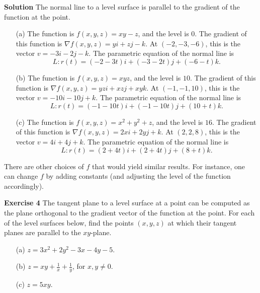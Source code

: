 \documentclass[12pt,oneside]{exam}
\newenvironment{exercise}[1]{\vspace{.1in}\noindent\textbf{Exercise #1 \hspace{.05em}}}{}
\newenvironment{newsolution}{\vspace{.1in}\noindent\textbf{Solution \hspace{.05em}}}{}
\begin{document}
\begin{newsolution}
The normal line to a level surface is parallel to the gradient of the function at the point. 
\begin{itemize}
\item[(a)] The function is $f(x,y,z)=xy-z$, and the level is $0$. The gradient of this function is $\nabla f(x,y,z) = yi + zj -k$. At $(-2,-3,-6)$, this is the vector 
$v=-3i -2j-k$. The parametric equation of the normal line is 
\begin{equation*}
L \colon r(t)=(-2 -3t)i +(-3-2t)j +(-6-t)k.
\end{equation*}
\item[(b)] The function is $f(x,y,z)=xyz$, and the level is $10$. The gradient of this function is $\nabla f (x,y,z)= yz i + xzj + xyk$. At $(-1,-1,10)$, this is the vector $v=-10i -10j +k$. The parametric equation of the normal line is 
\begin{equation*}
L \colon r(t)=(-1-10t)i+(-1-10t)j+(10+t)k.
\end{equation*}
\item[(c)] The function is $f(x,y,z)=x^2+y^2+z$, and the level is $16$. The gradient of this function is $\nabla f (x,y,z) = 2x i + 2y j + k$. At $(2,2,8)$, this is the vector $v=4i+4j+k$. The parametric equation of the normal line is 
\begin{equation*}
L \colon r(t)=(2+4t)i + (2+4t)j+(8+t)k.
\end{equation*}
\end{itemize}
There are other choices of $f$ that would yield similar results. For instance, one can change $f$ by adding constants (and adjusting the level of the function accordingly).
\end{newsolution}

\begin{exercise}{4}
The tangent plane to a level surface at a point can be computed as the plane orthogonal to the gradient vector of the function at the point.  For each of the level surfaces below, find the points $(x,y,z)$ at which their tangent planes are parallel to the $xy$-plane. 
\begin{itemize}
\item[(a)] $z=3x^2+2y^2-3x-4y-5$.
\item[(b)] $z=xy+\frac{1}{x} + \frac{1}{y}$, for $x,y \neq 0$.
\item[(c)] $z=5xy$.
\end{itemize}
\end{exercise}
\end{document}
